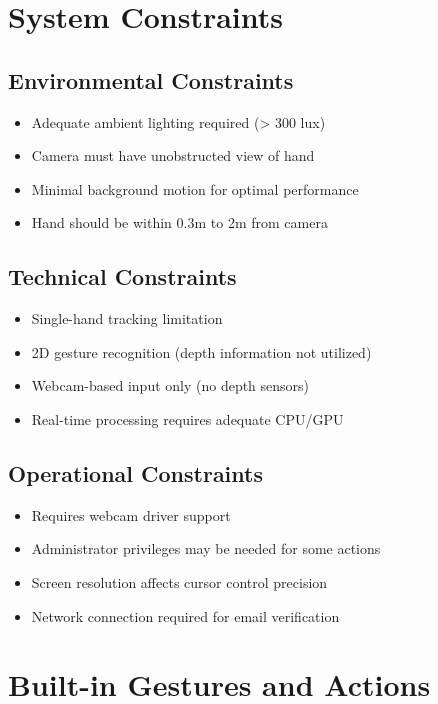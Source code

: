 \documentclass[12pt,a4paper]{report}
\begin{document}
\section{System Constraints}

\subsection{Environmental Constraints}
\begin{itemize}
    \item Adequate ambient lighting required (> 300 lux)
    \item Camera must have unobstructed view of hand
    \item Minimal background motion for optimal performance
    \item Hand should be within 0.3m to 2m from camera
\end{itemize}

\subsection{Technical Constraints}
\begin{itemize}
    \item Single-hand tracking limitation
    \item 2D gesture recognition (depth information not utilized)
    \item Webcam-based input only (no depth sensors)
    \item Real-time processing requires adequate CPU/GPU
\end{itemize}

\subsection{Operational Constraints}
\begin{itemize}
    \item Requires webcam driver support
    \item Administrator privileges may be needed for some actions
    \item Screen resolution affects cursor control precision
    \item Network connection required for email verification
\end{itemize}

\section{Built-in Gestures and Actions}
\end{document}
